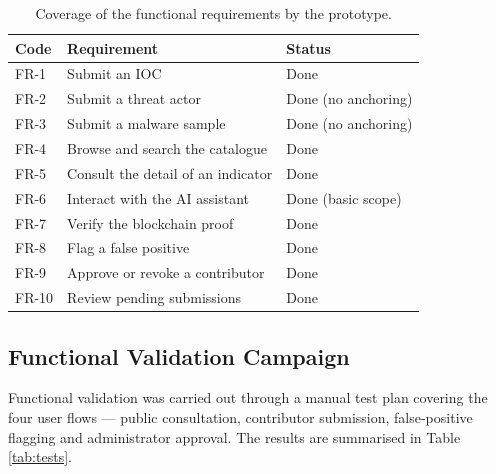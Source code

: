 \documentclass[12pt,a4paper,oneside]{book}
\begin{document}
{{\begin{table}[!h]
\caption{Coverage of the functional requirements by the prototype.}
\label{tab:eval-fr}
\centering
\renewcommand{\arraystretch}{1.35}
\begin{tabular}{| C{.08\textwidth} | p{.65\textwidth} | C{.17\textwidth} |}
\hline
\textbf{Code} & \textbf{Requirement} & \textbf{Status} \\
\hline\hline
FR-1  & \nohyphens{Submit an IOC}                          & Done \\
\hline
FR-2  & \nohyphens{Submit a threat actor}                  & Done (no anchoring) \\
\hline
FR-3  & \nohyphens{Submit a malware sample}                & Done (no anchoring) \\
\hline
FR-4  & \nohyphens{Browse and search the catalogue}        & Done \\
\hline
FR-5  & \nohyphens{Consult the detail of an indicator}     & Done \\
\hline
FR-6  & \nohyphens{Interact with the AI assistant}         & Done (basic scope) \\
\hline
FR-7  & \nohyphens{Verify the blockchain proof}            & Done \\
\hline
FR-8  & \nohyphens{Flag a false positive}                  & Done \\
\hline
FR-9  & \nohyphens{Approve or revoke a contributor}        & Done \\
\hline
FR-10 & \nohyphens{Review pending submissions}             & Done \\
\hline
\end{tabular}
\end{table}

\subsection{Functional Validation Campaign}

Functional validation was carried out through a manual test plan covering
the four user flows --- public consultation, contributor submission,
false-positive flagging and administrator approval. The results are
summarised in Table \ref{tab:tests}.

}}
\end{document}
